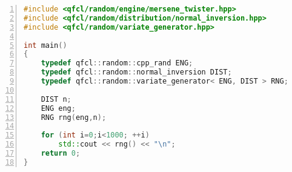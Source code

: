 %
\begin{lstlisting}[language=C++,caption=Sample C++ code: function interface,numbers=left]
#include <qfcl/random/engine/mersene_twister.hpp>
#include <qfcl/random/distribution/normal_inversion.hpp>
#include <qfcl/random/variate_generator.hpp>

int main()
{
    typedef qfcl::random::cpp_rand ENG;
    typedef qfcl::random::normal_inversion DIST;
    typedef qfcl::random::variate_generator< ENG, DIST > RNG;
    
    DIST n;
    ENG eng;
    RNG rng(eng,n);
    
    for (int i=0;i<1000; ++i) 
    	std::cout << rng() << "\n";
    return 0;
}
\end{lstlisting}

